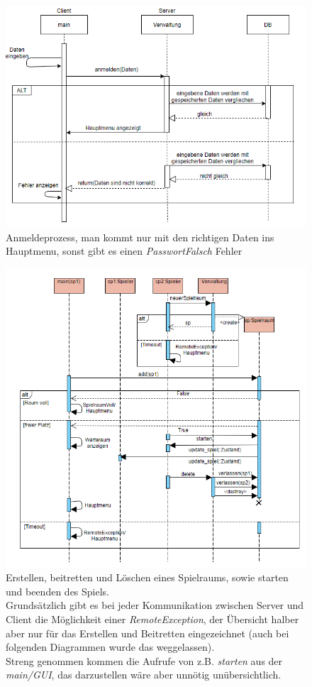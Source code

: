 \documentclass[11pt, a4paper, oneside]{memoir}                                                      %
\begin{document}
        \begin{figure}[h]
			\centering
			\includegraphics[scale=0.8]{../img/Sequenz_Diagramm/anmelden.png}
            \caption{Anmeldeprozess, man kommt nur mit den richtigen Daten ins Hauptmenu, sonst gibt es einen \textit{PasswortFalsch} Fehler}
        \end{figure}

        \begin{figure}[h]
			\centering
			\includegraphics[scale=0.75]{../img/Sequenz_Diagramm/spielraum.png}
            \caption{Erstellen, beitretten und Löschen eines Spielraums, sowie starten und beenden des Spiels. \\
                Grundsätzlich gibt es bei jeder Kommunikation zwischen Server und Client die Möglichkeit einer \textit{RemoteException}, der Übersicht halber aber nur für das Erstellen und Beitretten eingezeichnet (auch bei folgenden Diagrammen wurde das weggelassen). \\
                Streng genommen kommen die Aufrufe von z.B. \textit{starten} aus der \textit{main/GUI}, das darzustellen wäre aber unnötig unübersichtlich.}
        \end{figure}
\end{document}
